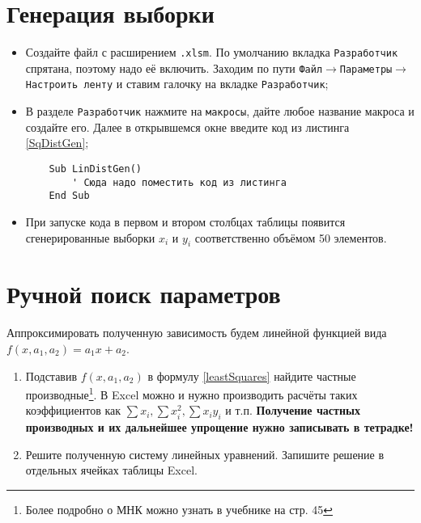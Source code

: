 \documentclass[14pt,a4paper]{article}
\begin{document}
\section{Генерация выборки}
\noindent\begin{itemize}
	\item Создайте файл с расширением \texttt{.xlsm}. По умолчанию вкладка \texttt{Разработчик} спрятана, поэтому надо её включить. Заходим по пути \texttt{Файл$\rightarrow$Параметры$\rightarrow$Настроить ленту} и ставим галочку на вкладке \texttt{Разработчик};
	\item В разделе \texttt{Разработчик} нажмите на \texttt{макросы}, дайте любое название макроса и создайте его. Далее в открывшемся окне введите код из листинга \ref{SqDistGen};
	\begin{lstlisting} 
	Sub LinDistGen()
		' Сюда надо поместить код из листинга
	End Sub  
	\end{lstlisting}
	\item При запуске кода в первом и втором столбцах таблицы появится сгенерированные выборки $x_i$ и $y_i$ соответственно объёмом 50 элементов.
\end{itemize}
\section{Ручной поиск параметров} \label{manualMethod}
Аппроксимировать полученную зависимость будем линейной функцией вида $f(x,a_1,a_2) = a_1x + a_2$.
\begin{enumerate}
    \item Подставив $f(x,a_1,a_2)$ в формулу \ref{leastSquares} найдите частные производные\footnote{Более подробно о МНК можно узнать в учебнике \cite{Stepanova2014} на стр. 45}. В Excel можно и нужно производить расчёты таких коэффициентов как $\sum x_i, \sum x_i^2, \sum x_iy_i$ и т.п. \textbf{Получение частных производных и их дальнейшее упрощение нужно записывать в тетрадке!}
    \item Решите полученную систему линейных уравнений. Запишите решение в отдельных ячейках таблицы Excel.
\end{enumerate}
\end{document}
